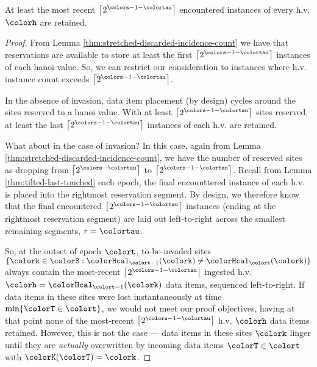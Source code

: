 \begin{lemma}
\label{thm:tilted-most-recent-retained}
At least the most recent $\left\lceil2^{\colors - 1 - \colortau}\right\rceil$ encountered instances of every h.v. $\colorh$ are retained.
\end{lemma}
\begin{proof}
From Lemma \ref{thm:stretched-discarded-incidence-count} we have that reservations are available to store at least the first $\left\lceil 2^{\colors - 1 - \colortau} \right\rceil$ instances of each hanoi value.
So, we can restrict our consideration to instances where h.v. instance count exceeds $\left\lceil 2^{\colors - 1 - \colortau} \right\rceil$.

In the absence of invasion, data item placement (by design) cycles around the sites reserved to a hanoi value.
With at least $\left\lceil 2^{\colors - 1 - \colortau} \right\rceil$ sites reserved, at least the last $\left\lceil 2^{\colors - 1 - \colortau} \right\rceil$ instances of each h.v. are retained.

What about in the case of invasion?
In this case, again from Lemma \ref{thm:stretched-discarded-incidence-count}, we have the number of reserved sites as dropping from $\left\lceil 2^{\colors - \colortau} \right\rceil$ to $\left\lceil 2^{\colors - 1 - \colortau} \right\rceil$.
Recall from Lemma \ref{thm:tilted-last-touched} each epoch, the final encounttered instance of each h.v. is placed into the rightmost reservation segment.
By design, we therefore know that the final encountered $\left\lceil 2^{\colors - 1 - \colortau} \right\rceil$ instances (ending at the rightmost reservation segment) are laid out left-to-right across the smallest remaining segments, $r = \colortau$.

So, at the outset of epoch $\colort$, to-be-invaded sites $\{\colork \in \colorS : \colorHcal_{\colort - 1}(\colork) \neq \colorHcal_{\colort}(\colork)\}$ always contain the most-recent $\left\lceil 2^{\colors - 1 - \colortau} \right\rceil$ ingested h.v. $\colorh = \colorHcal_{\colort - 1}(\colork)$ data items, sequenced left-to-right.
If data items in these sites were lost instantaneously at time $\min\{\colorT \in \colort\}$, we would not meet our proof objectives, having at that point none of the most-recent $\left\lceil 2^{\colors - 1 - \colortau} \right\rceil$ h.v. $\colorh$ data items retained.
However, this is not the case --- data items in these sites $\colork$ linger until they are \textit{actually} overwritten by incoming data items $\colorT \in \colort$ with $\colorK(\colorT) = \colork$.


\end{proof}
